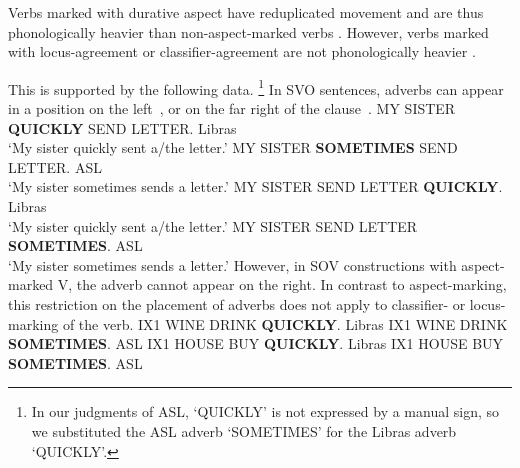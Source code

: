 \documentclass[output=paper]{langscibook}
\begin{document}
Verbs marked with durative aspect have reduplicated movement
\citep{Klima.Bellugi.1979} and are thus phonologically heavier than
non-aspect-marked verbs \citep{Brentari.1998}. However, verbs marked
with lo\-cus-agree\-ment or class\-i\-fier-agree\-ment are not phonologically
heavier \citep{Brentari.1998}.

This is supported by the following data.%
\footnote{%
    In our judgments of ASL, `QUICKLY' is not expressed by a manual sign, so
    we substituted the ASL adverb `{SOMETIMES}' for the Libras adverb `{QUICKLY}'.
}
In SVO sentences, adverbs can appear in a position on the left~, or on the
far right of the clause~.
\ea 
    \label{lasz:ex:13}
    \ea 
        {MY} {SISTER} \textbf{{QUICKLY}} {SEND}\laszPlain{} {LETTER}.
        \hfill 
        \cmark Libras
        \\
         ‘My sister quickly sent a/the letter.’
    \ex 
        {MY} {SISTER} \textbf{{SOMETIMES}} {SEND}\laszPlain{} {LETTER}. 
        \hfill 
        \cmark ASL 
        \\ 
        ‘My sister sometimes sends a letter.’
    \z 
\ex 
    \label{lasz:ex:14}
    \ea 
        {MY} {SISTER} {SEND}\laszPlain{} {LETTER} \textbf{{QUICKLY}}.
        \hfill 
        \cmark Libras 
        \\ 
        ‘My sister quickly sent a/the letter.’
    \ex 
        {MY} {SISTER} {SEND}\laszPlain{} {LETTER} \textbf{{SOMETIMES}}.
        \hfill 
        \cmark ASL 
        \\ 
        ‘My sister sometimes sends a letter.’
    \z 
\z 
However, in SOV constructions with aspect-marked V, the adverb
cannot appear on the right.
\ea 
    \label{lasz:ex:15}
    \z 
\ex 
    \label{lasz:ex:16}
    \z 
\z 
In contrast to aspect-marking, this restriction on the placement of
adverbs does not apply to classifier-  or locus-marking  of the
verb.
\ea 
    \label{lasz:ex:17}
    \ea 
         {IX1 WINE DRINK}\laszHs{\laszClaw} \textbf{{QUICKLY}}.
        \hfill 
        \cmark Libras
    \ex 
        {IX1 WINE DRINK}\laszHs{\laszClaw} \textbf{{SOMETIMES}}. 
        \hfill 
        \cmark ASL 
    \z 
\ex 
    \label{lasz:ex:18}
    \ea 
         {IX1 {HOUSE}} {BUY} \textbf{{QUICKLY}}. 
         \hfill 
         \cmark Libras
    \ex 
         {IX1 {HOUSE}} {BUY} \textbf{{SOMETIMES}}.
        \hfill 
        \cmark ASL
    \z 
\z 
\end{document}
